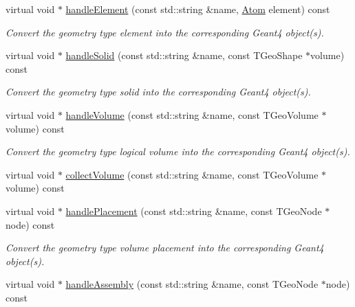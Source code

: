 \begin{DoxyCompactItemize}
virtual void $\ast$ \hyperlink{class_d_d4hep_1_1_simulation_1_1_geant4_converter_ae0567fc7090fdc7ae74926c8a67f6536}{handleElement} (const std::string \&name, \hyperlink{class_d_d4hep_1_1_geometry_1_1_atom}{Atom} element) const 
\begin{DoxyCompactList}\small\item\em Convert the geometry type element into the corresponding Geant4 object(s). \item\end{DoxyCompactList}\item 
virtual void $\ast$ \hyperlink{class_d_d4hep_1_1_simulation_1_1_geant4_converter_abde5fd683b2ac0721f3c0274af4803b8}{handleSolid} (const std::string \&name, const TGeoShape $\ast$volume) const 
\begin{DoxyCompactList}\small\item\em Convert the geometry type solid into the corresponding Geant4 object(s). \item\end{DoxyCompactList}\item 
virtual void $\ast$ \hyperlink{class_d_d4hep_1_1_simulation_1_1_geant4_converter_ade3b2a14ae42910778397b07c26357db}{handleVolume} (const std::string \&name, const TGeoVolume $\ast$volume) const 
\begin{DoxyCompactList}\small\item\em Convert the geometry type logical volume into the corresponding Geant4 object(s). \item\end{DoxyCompactList}\item 
virtual void $\ast$ \hyperlink{class_d_d4hep_1_1_simulation_1_1_geant4_converter_a5351cedc11f4e67a8786a6c013ff7cb1}{collectVolume} (const std::string \&name, const TGeoVolume $\ast$volume) const 
\item 
virtual void $\ast$ \hyperlink{class_d_d4hep_1_1_simulation_1_1_geant4_converter_a1a39afd969a6e73e22ea69229b06666c}{handlePlacement} (const std::string \&name, const TGeoNode $\ast$node) const 
\begin{DoxyCompactList}\small\item\em Convert the geometry type volume placement into the corresponding Geant4 object(s). \item\end{DoxyCompactList}\item 
virtual void $\ast$ \hyperlink{class_d_d4hep_1_1_simulation_1_1_geant4_converter_a7705c4c5dfd0dc6cf119ef8340d2f9f6}{handleAssembly} (const std::string \&name, const TGeoNode $\ast$node) const 

\end{DoxyCompactItemize}
